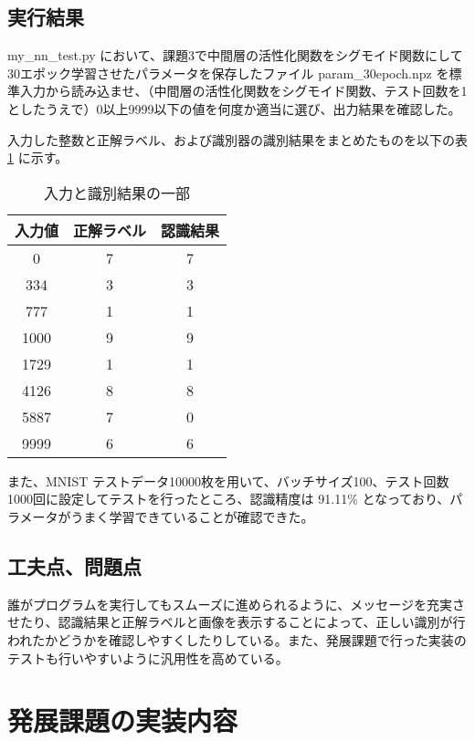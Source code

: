 \documentclass[a4paper,dvipdfmx]{jsarticle}
\begin{document}
\subsection*{実行結果}

my\_nn\_test.py において、課題3で中間層の活性化関数をシグモイド関数にして 30エポック学習させたパラメータを保存したファイル param\_30epoch.npz を標準入力から読み込ませ、（中間層の活性化関数をシグモイド関数、テスト回数を1としたうえで）0以上9999以下の値を何度か適当に選び、出力結果を確認した。

入力した整数と正解ラベル、および識別器の識別結果をまとめたものを以下の表 \ref{R1-1} に示す。

\begin{table}[H]
\begin{center}
\caption{入力と識別結果の一部}
  \begin{tabular}{|c|c|c|} \hline
    入力値 & 正解ラベル & 認識結果  \\ \hline \hline
    0 & 7 & 7 \\ \hline
    334 & 3 & 3 \\ \hline
    777 & 1 & 1 \\ \hline
    1000 & 9 & 9 \\ \hline
    1729 & 1 & 1 \\ \hline
    4126 & 8 & 8 \\ \hline
    5887 & 7 & 0 \\ \hline
    9999 & 6 & 6 \\ \hline
  \end{tabular}
	\label{R1-1}
\end{center}
\end{table}

また、MNIST テストデータ10000枚を用いて、バッチサイズ100、テスト回数1000回に設定してテストを行ったところ、認識精度は 91.11\% となっており、パラメータがうまく学習できていることが確認できた。

\subsection*{工夫点、問題点}
誰がプログラムを実行してもスムーズに進められるように、メッセージを充実させたり、認識結果と正解ラベルと画像を表示することによって、正しい識別が行われたかどうかを確認しやすくしたりしている。また、発展課題で行った実装のテストも行いやすいように汎用性を高めている。

\newpage

\section*{発展課題の実装内容}
\end{document}
